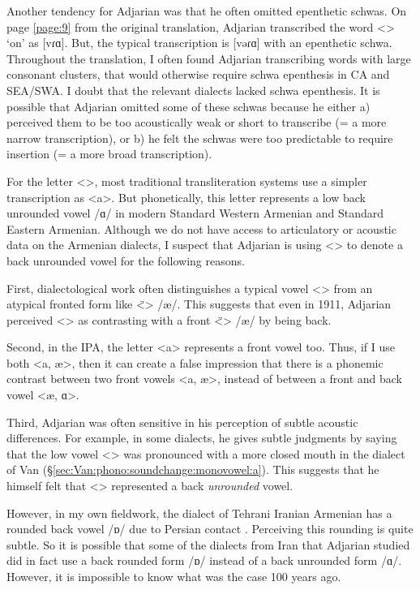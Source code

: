\documentclass[output=paper]{langscibook}
\begin{document}
Another   tendency for Adjarian was that he often omitted epenthetic schwas. On page \ref{page:9} from the original translation, Adjarian transcribed the word <> `on' as [vɾɑ]. But, the typical transcription is [vəɾɑ] with an epenthetic schwa. Throughout the translation, I often found Adjarian transcribing words with large consonant clusters, that would otherwise require schwa epenthesis in CA and SEA/SWA. I doubt that the relevant dialects lacked schwa epenthesis. It is possible that  Adjarian omitted some of these schwas because he either a) perceived them to be too acoustically weak or short to transcribe (= a more narrow transcription), or b) he felt the schwas were too predictable to require insertion (= a more broad transcription). 




For the letter <>, most traditional transliteration systems use a simpler transcription as <a>. But phonetically, this letter represents a low back unrounded vowel /ɑ/ in modern Standard Western Armenian and Standard Eastern Armenian. Although we do not have access to articulatory or acoustic data on the Armenian dialects, I suspect that Adjarian is using <> to denote a back unrounded vowel     for the following reasons.


First, dialectological work often distinguishes a typical vowel <> from an atypical fronted form like <̈> /æ/. This suggests that even in 1911, Adjarian perceived <> as contrasting with a front <̈> /æ/ by being back. 

Second, in the IPA, the letter <a> represents a front vowel too. Thus, if I use both <a, æ>, then it can create a false impression that there is a phonemic contrast between two front vowels <a, æ>, instead of between a front and back vowel <æ, ɑ>. 
	
	Third, Adjarian was often sensitive in his perception of subtle acoustic differences. For example, in some dialects, he gives subtle judgments by saying that the low vowel <> was pronounced with a more closed mouth in the dialect of Van (\S\ref{sec:Van:phono:soundchange:monovowel:a}). This suggests that he himself felt that <> represented a back \textit{unrounded} vowel. 
	
	However, in my own fieldwork, the dialect of Tehrani Iranian Armenian has a rounded back vowel /ɒ/ due to Persian contact \citep[\S2.1.4]{DolatianEtAl-prep-IranianGrammar}. Perceiving this rounding is quite subtle. So it is possible that some of the dialects from Iran that Adjarian studied     did in fact use a back rounded form /ɒ/ instead of a back unrounded form /ɑ/. However, it is impossible to know what was the case 100 years ago.
 
\end{document}
